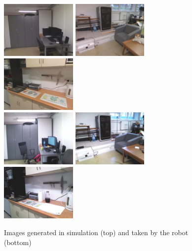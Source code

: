 \documentclass{svproc}
\begin{document}
\begin{figure}[!ht]
    \centering
    \includegraphics[width=0.33\textwidth]{img/sim_vs_tiago/sim_biurko.jpg}\hfill%
    \includegraphics[width=0.33\textwidth]{img/sim_vs_tiago/sim_fotel.jpg}\hfill%
    \includegraphics[width=0.33\textwidth]{img/sim_vs_tiago/sim_kuchnia_blat.jpg}\\
    \includegraphics[width=0.33\textwidth]{img/sim_vs_tiago/tia_biurko.jpg}\hfill%
    \includegraphics[width=0.33\textwidth]{img/sim_vs_tiago/tia_fotel.jpg}\hfill%
    \includegraphics[width=0.33\textwidth]{img/sim_vs_tiago/tia_kuchnia_blat.jpg}\\
    \caption{Images generated in simulation (top) and taken by the robot (bottom)}
    \label{fig:sim_vs_tiago}
\end{figure}
\end{document}
